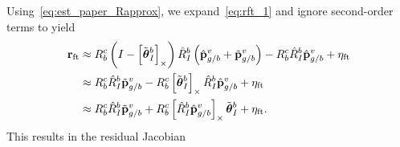 Using~\eqref{eq:est_paper_Rapprox}, we expand~\eqref{eq:rft_1} and ignore
second-order terms to yield
\begin{align}
   \boldsymbol{\mathrm{r}}_{\text{ft}} &\approx R_b^c \left( I - \left[ \tilde{\boldsymbol{\mathrm{\theta}}}_I^b  \right]_{\times}\right) \hat{R}_I^b \left( \hat{\boldsymbol{\mathrm{p}}}_{g/b}^v + \tilde{\boldsymbol{\mathrm{p}}}_{g/b}^v \right) 
                          - R_b^c \hat{R}_I^b \hat{\boldsymbol{\mathrm{p}}}_{g/b}^v +
                          \eta_{\text{ft}} \\
  &\approx R_b^c \hat{R}_I^b \tilde{\boldsymbol{\mathrm{p}}}_{g/b}^v -
  R_b^c \left[ \tilde{\boldsymbol{\mathrm{\theta}}}_I^b  \right]_{\times} \hat{R}_I^b \hat{\boldsymbol{\mathrm{p}}}_{g/b}^v 
      + \eta_{\text{ft}} \\
&\approx R_b^c \hat{R}_I^b \tilde{\boldsymbol{\mathrm{p}}}_{g/b}^v + R_b^c \left[ \hat{R}_I^b \hat{\boldsymbol{\mathrm{p}}}_{g/b}^v \right]_{\times} \tilde{\boldsymbol{\mathrm{\theta}}}_I^b 
      + \eta_{\text{ft}}.
\end{align}
This results in the residual Jacobian
